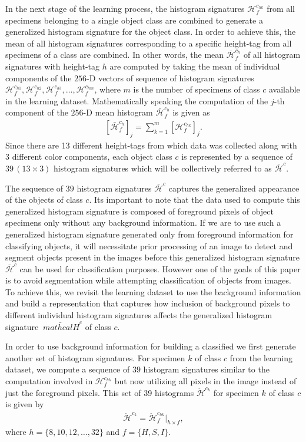 \documentclass {udthesis}
\begin{document}
In the next stage of the learning process, the histogram signatures $\mathcal{H}^{c_{hk}}_f$ from all specimens belonging to a single object class are combined to generate a generalized histogram signature for the object class.
In order to achieve this, the mean of all histogram signatures corresponding to a specific height-tag from all specimens of a class are combined. In other words, the mean $\bar{\mathcal{H}}^{c_{h}}_f$ of all histogram signatures with  height-tag $h$ are computed by taking the mean of individual components of the $256$-D vectors of sequence of histogram signatures $\mathcal{H}^{c_{h1}}_f, \mathcal{H}^{c_{h2}}_f, \mathcal{H}^{c_{h3}}_f, \ldots, \mathcal{H}^{c_{hm}}_f$, where $m$ is the number of specimens of class $c$ available in the learning dataset. Mathematically speaking the computation of the $j$-th component of the $256$-D mean histogram $\bar{\mathcal{H}}^{c_{h}}_f$ is given as
\begin{align}
 \left[\bar{\mathcal{H}}^{c_{h}}_f\right]_j=\sum_{k=1}^{m} \left[ \mathcal{H}^{c_{hk}}_f \right]_j.
\end{align}
Since there are 13 different height-tags from which data was collected along with 3 different color components, each object class $c$ is represented by a sequence of $39\, (13 \times 3)$ histogram signatures which will be collectively referred to as $\bar{\mathcal{H}}^{c}$.

The sequence of $39$ histogram signatures $\bar{\mathcal{H}}^{c}$ captures the generalized appearance of the objects of class $c$. Its important to note that the data used to compute this generalized histogram signature is composed of foreground pixels of object specimens only without any background information. If we are to use such a generalized histogram signature generated only from foreground information for classifying objects, it will necessitate prior processing of an image to detect and segment objects present in the images before this generalized histogram signature $\bar{\mathcal{H}}^{c}$ can be used for classification purposes. However one of the goals of this paper is to avoid segmentation while attempting classification of objects from images. To achieve this, we revisit the learning dataset to use the background information and build a representation that captures how inclusion of background pixels to different individual histogram signatures affects the generalized histogram signature $\bar{\
mathcal{H}}^{c}$ of class $c$. 

In order to use background information for building a classified we first generate another set of histogram signatures.
For specimen $k$ of class $c$ from the learning dataset, we compute a sequence of $39$ histogram signatures similar to the computation involved in $\mathcal{H}^{c_{hk}}_f$ but now utilizing all pixels in the image instead of just the foreground pixels. This set of 39 histograms $\ddot{\mathcal{H}}^{c_{k}}$ for specimen $k$ of class $c$ is given by
\begin{align}	\label{eqn:hist_signature}
 \ddot{\mathcal{H}}^{c_{k}} = \ddot{\mathcal{H}}^{c_{hk}}_f \Big|_{h\times f},
\end{align}
%
where $h=\{8,10,12, \ldots,32\}$ and $f=\{H,S,I\}$.
\end{document}
